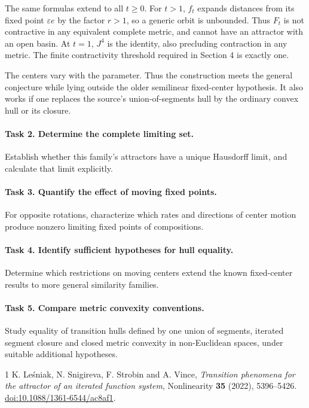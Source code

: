 \documentclass[11pt]{article}
\begin{document}
The same formulas extend to all $t\geq0$. For $t>1$, $f_t$ expands
distances from its fixed point $\varepsilon e$ by the factor $r>1$,
so a generic orbit is unbounded. Thus $F_t$ is not contractive in any
equivalent complete metric, and cannot have an attractor with an open
basin. At $t=1$, $J^4$ is the identity, also precluding contraction
in any metric. The finite contractivity threshold required in
Section 4 is exactly one.

The centers vary with the parameter. Thus the construction meets the
general conjecture while lying outside the older semilinear
fixed-center hypothesis. It also works if one replaces the source's
union-of-segments hull by the ordinary convex hull or its closure.

\paragraph{Task 2. Determine the complete limiting set.}
Establish whether this family's attractors have a unique Hausdorff
limit, and calculate that limit explicitly.

\paragraph{Task 3. Quantify the effect of moving fixed points.}
For opposite rotations, characterize which rates and directions of
center motion produce nonzero limiting fixed points of compositions.

\paragraph{Task 4. Identify sufficient hypotheses for hull equality.}
Determine which restrictions on moving centers extend the known
fixed-center results to more general similarity families.

\paragraph{Task 5. Compare metric convexity conventions.}
Study equality of transition hulls defined by one union of segments,
iterated segment closure and closed metric convexity in non-Euclidean
spaces, under suitable additional hypotheses.

\begin{thebibliography}{1}
 K. Le\'sniak, N. Snigireva, F. Strobin and A. Vince,
\emph{Transition phenomena for the attractor of an iterated function
system}, Nonlinearity \textbf{35} (2022), 5396--5426.
\href{https://doi.org/10.1088/1361-6544/ac8af1}{doi:10.1088/1361-6544/ac8af1}.
\end{thebibliography}
\end{document}
